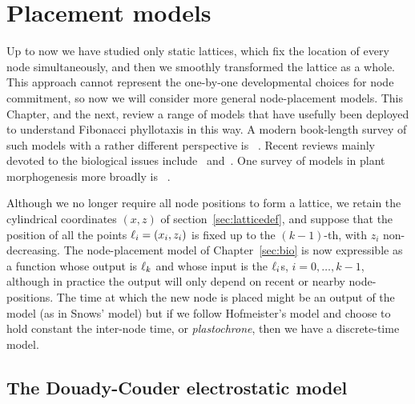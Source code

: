 
 
\chapter{Placement models}
\label{ch:placement}
Up to now we have studied only static lattices, which fix the location of every node simultaneously, and then we smoothly transformed the lattice as a whole. This approach cannot represent the one-by-one developmental choices for node commitment, so now we will consider more general node-placement models. This Chapter, and the next, review a range of models that have usefully been deployed to understand Fibonacci phyllotaxis in this way. A modern book-length survey of such models with a rather different perspective is ~\autocite{barabePhyllotacticPatternsMultidisciplinary2020}. Recent reviews mainly devoted to the biological issues include~\cite{traasPhyllotaxis2013} and~\cite{godinPhyllotaxisGeometricCanalization2020}. One survey of models in plant morphogenesis more broadly is  ~\autocite{prusinkiewiczComputationalModelsPlant2012}.

Although we no longer require all node positions to form a lattice, we retain the cylindrical coordinates $(x,z)$ of section~\ref{sec:latticedef}, and suppose that the position of all the points $\ell_{{i}} = (x_i,z_i)$ is fixed up to the $(k-1)$-th, with $z_i$ non-decreasing. The node-placement model of Chapter~\ref{sec:bio} is now expressible as a function whose output is $\ell_{{k}}$ and whose input is the $\ell_{{i}}$s, $i=0,\ldots, k-1$,
although in practice the output will only depend on recent or nearby node-positions. The time at which the new node is placed might be an output of the model (as in Snows' model) but if we follow Hofmeister's model and choose to hold constant the inter-node time, or \textit{plastochrone},  then we have a discrete-time model. 


\section{The Douady-Couder electrostatic model}
\label{sec:DouadyCouderModel}

